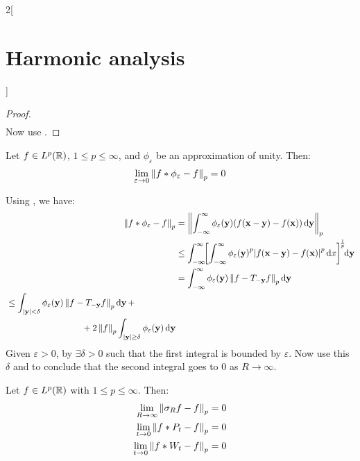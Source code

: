 \documentclass[../../../main_math.tex]{subfiles}
\begin{document}
\begin{multicols}{2}[\section{Harmonic analysis}]
\begin{proof}
\begin{align*}
    \end{align*}
    Now use .
  \end{proof}
  \begin{theorem}\label{HA:kernelConvLp}
    Let $f\in L^p(\mathbb{R})$, $1\leq p\leq\infty$, and $\phi_\varepsilon$ be an approximation of unity. Then:
    \begin{equation*}
      \lim_{\varepsilon\to 0}\left\|f*\phi_\varepsilon-f\right\|_p =0 \\
    \end{equation*}
  \end{theorem}
  \begin{sproof}
    Using , we have:
    \begin{align*}
      \norm{f*\phi_\varepsilon-f}_p & =\norm{\int_{-\infty}^{\infty}\phi_\varepsilon(\vf{y})(f(\vf{x}-\vf{y})-f(\vf{x}))\dd{\vf{y}}}_p                                                                         \\
                                    & \leq\int_{-\infty}^{\infty}\!\!{\left[\int_{-\infty}^{\infty}{\phi_\varepsilon(\vf{y})}^p\abs{f(\vf{x}-\vf{y})-f(\vf{x})}^p\dd{x}\right]}^{\!\frac{1}{p}}\!\!\dd{\vf{y}} \\
                                    & = \int_{-\infty}^{\infty}\phi_\varepsilon(\vf{y})\norm{f-T_{-\vf{y}}f}_p\dd{\vf{y}}                                                                                      \\
      \begin{split}
        & \leq \int_{\abs{\vf{y}}< \delta}\phi_\varepsilon(\vf{y})\norm{f-T_{-\vf{y}}f}_p\dd{\vf{y}}+\\
        &\hspace{3cm}+2\norm{f}_p\int_{\abs{\vf{y}}\geq\delta}\phi_\varepsilon(\vf{y})\dd{\vf{y}}
      \end{split}
    \end{align*}
    Given $\varepsilon>0$, by  $\exists\delta>0$ such that the first integral is bounded by $\varepsilon$. Now use this $\delta$ and  to conclude that the second integral goes to 0 as $R\to\infty$.
  \end{sproof}
  \begin{corollary}
    Let $f\in L^p(\mathbb{R})$ with $1\leq p\leq\infty$. Then:
    \begin{align*}
      \lim_{R\to\infty}\left\|\sigma_Rf-f\right\|_p & =0 \\
      \lim_{t\to 0}\left\|f*P_t-f\right\|_p         & =0 \\
      \lim_{t\to 0}\left\|f*W_t-f\right\|_p         & =0
    \end{align*}
  \end{corollary}

\end{multicols}
\end{document}
